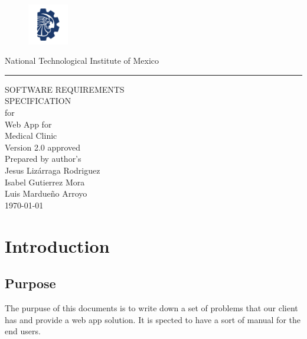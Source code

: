 \documentclass{scrreprt}
\date{}
\def\myversion{2.0 }
\begin{document}
	\begin{figure}
		\includegraphics[width=50pt,height=50pt]{tecnm.PNG}
	\end{figure}
	
	\raggedright \large National Technological Institute of Mexico\vskip0.5cm
		\rule{20cm}{5pt}\vskip0.5cm
		\begin{bfseries}
			
			\begin{flushright}
			\Huge{SOFTWARE REQUIREMENTS\\ SPECIFICATION}\\
			\vspace{1.2cm}
			for\\
			\vspace{0.5cm}
			\Huge Web App for\\Medical Clinic\\
			\vspace{1.6cm}
			\LARGE Version \myversion approved\\
			\vspace{1.3cm}
			Prepared by author's\\
			\vspace{0.2cm}
			Jesus Lizárraga Rodriguez\\
			\vspace{0.2cm}
			Isabel Gutierrez Mora\\
			\vspace{0.2cm}
			Luis Mardueño Arroyo\\
			
			\vspace{0.7cm}
			\today\\
		\end{flushright}
		
		\end{bfseries}
	
		
	
	
	\tableofcontents
	
	
	\chapter{Introduction}
	
	\section{Purpose}
	The purpuse of this documents is to write down a set of problems that our client has and provide a web app solution. It is spected to have a sort of manual for the end users.
	
\end{document}
